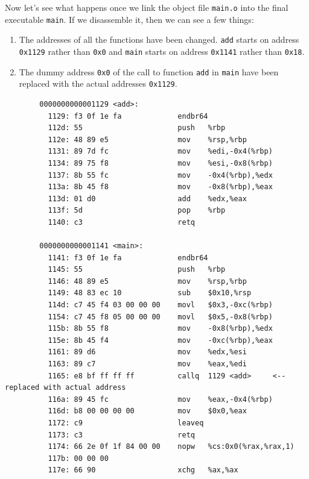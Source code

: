 \documentclass{article}
\begin{document}
      Now let's see what happens once we link the object file \texttt{main.o} into the final executable \texttt{main}. If we disassemble it, then we can see a few things: 
      \begin{enumerate}
        \item The addresses of all the functions have been changed. \texttt{add} starts on address \texttt{0x1129} rather than \texttt{0x0} and \texttt{main} starts on address \texttt{0x1141} rather than \texttt{0x18}. 
        \item The dummy address \texttt{0x0} of the call to function \texttt{add} in \texttt{main} have been replaced with the actual addresses \texttt{0x1129}. 
      \end{enumerate}

      \begin{lstlisting}
        0000000000001129 <add>:
          1129:	f3 0f 1e fa          	endbr64 
          112d:	55                   	push   %rbp
          112e:	48 89 e5             	mov    %rsp,%rbp
          1131:	89 7d fc             	mov    %edi,-0x4(%rbp)
          1134:	89 75 f8             	mov    %esi,-0x8(%rbp)
          1137:	8b 55 fc             	mov    -0x4(%rbp),%edx
          113a:	8b 45 f8             	mov    -0x8(%rbp),%eax
          113d:	01 d0                	add    %edx,%eax
          113f:	5d                   	pop    %rbp
          1140:	c3                   	retq   

        0000000000001141 <main>:
          1141:	f3 0f 1e fa          	endbr64 
          1145:	55                   	push   %rbp
          1146:	48 89 e5             	mov    %rsp,%rbp
          1149:	48 83 ec 10          	sub    $0x10,%rsp
          114d:	c7 45 f4 03 00 00 00 	movl   $0x3,-0xc(%rbp)
          1154:	c7 45 f8 05 00 00 00 	movl   $0x5,-0x8(%rbp)
          115b:	8b 55 f8             	mov    -0x8(%rbp),%edx
          115e:	8b 45 f4             	mov    -0xc(%rbp),%eax
          1161:	89 d6                	mov    %edx,%esi
          1163:	89 c7                	mov    %eax,%edi
          1165:	e8 bf ff ff ff       	callq  1129 <add>     <-- replaced with actual address
          116a:	89 45 fc             	mov    %eax,-0x4(%rbp)
          116d:	b8 00 00 00 00       	mov    $0x0,%eax
          1172:	c9                   	leaveq 
          1173:	c3                   	retq   
          1174:	66 2e 0f 1f 84 00 00 	nopw   %cs:0x0(%rax,%rax,1)
          117b:	00 00 00 
          117e:	66 90                	xchg   %ax,%ax 
      \end{lstlisting}
\end{document}
